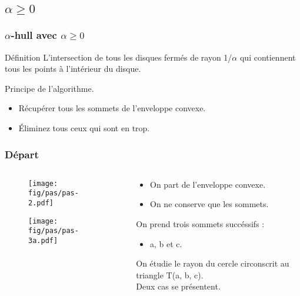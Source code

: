 \subsection{$\alpha \geq 0$}

\begin{frame}
  \frametitle{$\alpha$-hull avec $\alpha \geq 0$}
  \begin{block}{Définition}
		L'intersection de tous les disques fermés de rayon 1/$\alpha$ qui contiennent tous les points à l’intérieur du disque.
	\end{block} 
 
	\begin{block}{Principe de l'algorithme.}
		\begin{itemize}
			\item Récupérer tous les sommets de l'enveloppe convexe.
			\item Éliminez tous ceux qui sont en trop.
		\end{itemize}	
	\end{block} 


\end{frame}


\begin{frame}
  \frametitle{Départ}
\begin{columns}[t]
    \begin{column}{7cm}
      {
        \begin{figure}[h!]
          \centering
          \texttt{[image: fig/pas/pas-2.pdf]}
        \end{figure}
      }
      {
        \begin{figure}[h!]
          \centering
          \texttt{[image: fig/pas/pas-3a.pdf]}
        \end{figure}
      }      
    \end{column}
    \begin{column}{3cm}
      \begin{block}{}
        {
			 		\begin{itemize}
						\item On part de l'enveloppe convexe.
						\item On ne conserve que les sommets.
					\end{itemize}
				}
        {
          On prend trois sommets succéssifs :
			 		\begin{itemize}
						\item a, b et c.
					\end{itemize}
          On étudie le rayon du cercle circonscrit au triangle T(a, b, c).\\
					\alert{Deux cas se présentent.}
        }
      \end{block}  
    \end{column}
  \end{columns}
\end{frame}

